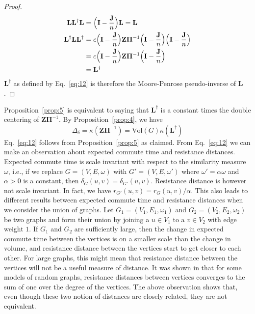 \documentclass[10pt,twocolumn]{article}
\numberwithin{equation}{section}
\begin{document}
\begin{proof}
\begin{align*}
    \mathbf{L}\mathbf{L}^{\dagger}\mathbf{L} & = \Bigl(\mathbf{I} -
    \frac{\mathbf{J}}{n}\Bigr) \mathbf{L} = \mathbf{L} \\
    \mathbf{L}^{\dagger}\mathbf{L}\mathbf{L}^{\dagger} &= c
    \Bigl(\mathbf{I} - \frac{\mathbf{J}}{n}\Bigr) \mathbf{Z}
    \bm{\Pi}^{-1} \Bigl(\mathbf{I} - \frac{\mathbf{J}}{n}\Bigr)
    \Bigl(\mathbf{I} - \frac{\mathbf{J}}{n}\Bigr) \\ &= c \Bigl(\mathbf{I}
    - \frac{\mathbf{J}}{n}\Bigr) \mathbf{Z} \bm{\Pi}^{-1}
    \Bigl(\mathbf{I} - \frac{\mathbf{J}}{n}\Bigr) \\ &=
    \mathbf{L}^{\dagger}
  \end{align*}
  $\mathbf{L}^{\dagger}$ as defined by Eq.~\eqref{eq:12} is therefore the
  Moore-Penrose pseudo-inverse of $\mathbf{L}$. 
\end{proof}
Proposition~\ref{prop:5} is equivalent to saying that
$\mathbf{L}^{\dagger}$ is a constant times the double centering of
$\mathbf{Z}\bm{\Pi}^{-1}$. By Proposition~\ref{prop:4}, we have 
\begin{equation}
  \label{eq:42}
 \Delta_{\delta} = \kappa(\mathbf{Z}\bm{\Pi}^{-1}) = \mathrm{Vol}(G)
\kappa(\mathbf{L}^{\dagger}) 
\end{equation}
Eq.~\eqref{eq:12} follows from Proposition~\ref{prop:5} as
claimed. From Eq.~\eqref{eq:12} we can make an observation about
expected commute time and resistance distances. Expected commute time
is scale invariant with respect to the similarity measure $\omega$,
i.e., if we replace $G = (V,E,\omega)$ with $G' = (V,E,\omega')$ where
$\omega' = \alpha \omega$ and $\alpha > 0$ is a constant, then
$\delta_{G}(u,v) = \delta_{G'}(u,v)$. Resistance distance is however
not scale invariant. In fact, we have $r_{G'}(u,v) =
r_{G}(u,v)/\alpha$. This also leads to different results between
expected commute time and resistance distances when we consider the
union of graphs. Let $G_1 = (V_1, E_1, \omega_1)$ and $G_2 = (V_2,E_2,
\omega_2)$ be two graphs and form their union by joining a $u \in V_1$
to a $v \in V_2$ with edge weight $1$. If $G_1$ and $G_2$ are
sufficiently large, then the change in expected commute time between
the vertices is on a smaller scale than the change in volume, and
resistance distance between the vertices start to get closer to each
other. For large graphs, this might mean that resistance distance
between the vertices will not be a useful measure of
distance. It was shown in \cite{radl09} that for some models of random graphs,
resistance distances between vertices converges to the sum of one over
the degree of the vertices. The above observation shows that, even though
these two notion of distances are closely related, they are not
equivalent.
\end{document}
